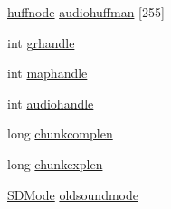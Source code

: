 \begin{DoxyCompactItemize}
\item 
\hyperlink{structhuffnode}{huffnode} \hyperlink{ID__CA_8C_a8e5f1f3c10267328291b7098e3647966}{audiohuffman} \mbox{[}255\mbox{]}
\item 
int \hyperlink{ID__CA_8C_a28e170b2191c9c1895b6a205499e9ed5}{grhandle}
\item 
int \hyperlink{ID__CA_8C_a04317788d33560e757415d06e7688914}{maphandle}
\item 
int \hyperlink{ID__CA_8C_a8a34d1a17f2f8ce7cf4fd38f34048890}{audiohandle}
\item 
long \hyperlink{ID__CA_8C_a318a356958b8ef67a195419e793ebe0a}{chunkcomplen}
\item 
long \hyperlink{ID__CA_8C_a8e972da6995bf0bfdeac78b078feebc8}{chunkexplen}
\item 
\hyperlink{ID__SD_8H_af66c128f54042fe02b7297e3e29a8b6d}{SDMode} \hyperlink{ID__CA_8C_a3b853c53777a93064c62a47de089de01}{oldsoundmode}
\end{DoxyCompactItemize}


